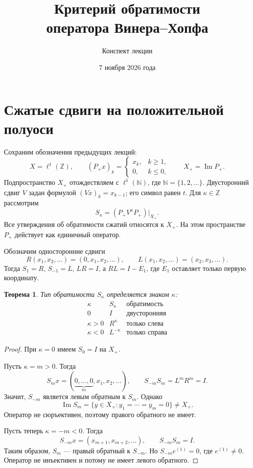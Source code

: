 \documentclass[12pt,a4paper]{article}
\title{Критерий обратимости\\оператора Винера--Хопфа}
\author{Конспект лекции}
\date{7 ноября 2026 года}
\newtheorem{theorem}{Теорема}
\theoremstyle{definition}
\theoremstyle{remark}
\newcommand{\ZZ}{\mathbb{Z}}
\begin{document}
\maketitle

\section{Сжатые сдвиги на положительной полуоси}

Сохраним обозначения предыдущих лекций:
\[
  X=\ell^1(\ZZ),\qquad
  (P_+x)_k=\begin{cases}x_k,&k\geqslant1,\\0,&k\leqslant0,\end{cases}
  \qquad X_+=\operatorname{Im}P_+.
\]
Подпространство $X_+$ отождествляем с $\ell^1(\mathbb N)$,
где $\mathbb N=\{1,2,\ldots\}$. Двусторонний сдвиг
$V$ задан формулой $(Vx)_k=x_{k-1}$; его символ равен $t$.
Для $\kappa\in\ZZ$ рассмотрим
\[
  S_\kappa=(P_+V^\kappa P_+)\big|_{X_+}.
\]
Все утверждения об обратимости сжатий относятся к $X_+$.
На этом пространстве $P_+$ действует как единичный оператор.

Обозначим односторонние сдвиги
\[
  R(x_1,x_2,\ldots)=(0,x_1,x_2,\ldots),\qquad
  L(x_1,x_2,\ldots)=(x_2,x_3,\ldots).
\]
Тогда $S_1=R$, $S_{-1}=L$, $LR=I$, а $RL=I-E_1$,
где $E_1$ оставляет только первую координату.

\begin{theorem}
Тип обратимости $S_\kappa$ определяется знаком $\kappa$:
\[
  \begin{array}{c|c|c}
    \kappa& S_\kappa&\text{обратимость}\\\hline
    0&I&\text{двусторонняя}\\
    \kappa>0&R^\kappa&\text{только слева}\\
    \kappa<0&L^{-\kappa}&\text{только справа}
  \end{array}
\]
\end{theorem}

\begin{proof}
При $\kappa=0$ имеем $S_0=I$ на $X_+$.

Пусть $\kappa=m>0$. Тогда
\[
  S_mx=(\underbrace{0,\ldots,0}_{m},x_1,x_2,\ldots),\qquad
  S_{-m}S_m=L^mR^m=I.
\]
Значит, $S_{-m}$ является левым обратным к $S_m$.
Однако
\[
  \operatorname{Im}S_m
  =\{y\in X_+:y_1=\cdots=y_m=0\}\ne X_+.
\]
Оператор не сюръективен, поэтому правого обратного не имеет.

Пусть теперь $\kappa=-m<0$. Тогда
\[
  S_{-m}x=(x_{m+1},x_{m+2},\ldots),\qquad S_{-m}S_m=I.
\]
Таким образом, $S_m$ --- правый обратный к $S_{-m}$.
Но $S_{-m}e^{(1)}=0$, где $e^{(1)}\ne0$. Оператор не инъективен
и потому не имеет левого обратного.
\end{proof}
\end{document}
